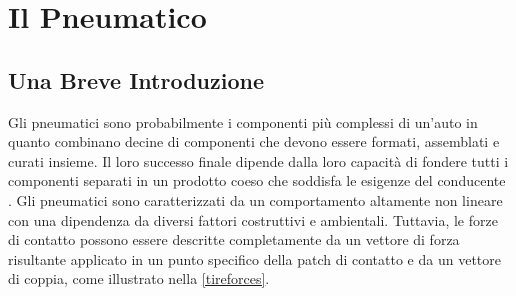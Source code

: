 \chapter{Il Pneumatico}
\label{Pneumatico}
%
\section{Una Breve Introduzione}
Gli pneumatici sono probabilmente i componenti più complessi di un'auto in quanto combinano decine di componenti che devono essere formati, assemblati e curati insieme. Il loro successo finale dipende dalla loro capacità di fondere tutti i componenti separati in un prodotto coeso che soddisfa le esigenze del conducente \cite{rill}. Gli pneumatici sono caratterizzati da un comportamento altamente non lineare con una dipendenza da diversi fattori costruttivi e ambientali. Tuttavia, le forze di contatto possono essere descritte completamente da un vettore di forza risultante applicato in un punto specifico della patch di contatto e da un vettore di coppia, come illustrato nella \figurename{  \ref{tireforces}}.

